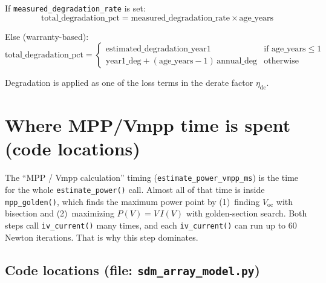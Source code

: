 \documentclass[11pt,a4paper]{article}
\begin{document}
If \texttt{measured\_degradation\_rate} is set:
\begin{equation}
  \text{total\_degradation\_pct} = \text{measured\_degradation\_rate} \times \text{age\_years}
\end{equation}

Else (warranty-based):
\begin{equation}
  \text{total\_degradation\_pct} =
  \begin{cases}
    \text{estimated\_degradation\_year1} & \text{if } \text{age\_years} \le 1 \\
    \text{year1\_deg} + (\text{age\_years} - 1)\,\text{annual\_deg} & \text{otherwise}
  \end{cases}
\end{equation}

Degradation is applied as one of the loss terms in the derate factor \(\eta_{\mathrm{dc}}\).

\section{Where MPP/Vmpp time is spent (code locations)}

The ``MPP / Vmpp calculation'' timing (\texttt{estimate\_power\_vmpp\_ms}) is the time for the whole \texttt{estimate\_power()} call. Almost all of that time is inside \texttt{mpp\_golden()}, which finds the maximum power point by (1)~finding \(V_{\mathrm{oc}}\) with bisection and (2)~maximizing \(P(V)=V\,I(V)\) with golden-section search. Both steps call \texttt{iv\_current()} many times, and each \texttt{iv\_current()} can run up to 60 Newton iterations. That is why this step dominates.

\subsection{Code locations (file: \texttt{sdm\_array\_model.py})}
\end{document}
